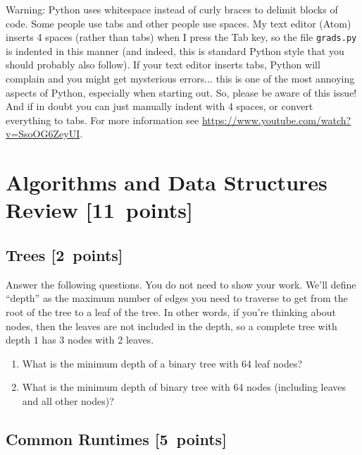 \documentclass{article}
\newcommand{\blu}[1]{{\textcolor{blu}{#1}}}
\let\ask\blu
\newcommand\pts[1]{\textcolor{pointscolour}{[#1~points]}}
\begin{document}
  Warning: Python uses whitespace instead of curly braces to delimit blocks of code.
  Some people use tabs and other people use spaces. My text editor (Atom) inserts 4 spaces (rather than tabs) when
  I press the Tab key, so the file \texttt{grads.py} is indented in this manner (and indeed, this is standard Python style that you should probably also follow). If your text editor inserts tabs,
  Python will complain and you might get mysterious errors... this is one of the most annoying aspects
  of Python, especially when starting out. So, please be aware of this issue! And if in doubt you can just manually
  indent with 4 spaces, or convert everything to tabs. For more information
  see \url{https://www.youtube.com/watch?v=SsoOG6ZeyUI}.


  \clearpage\section{Algorithms and Data Structures Review \pts{11}}

  \subsection{Trees \pts{2}}

  \ask{Answer the following questions.} You do not need to show your work. We'll define ``depth'' as the maximum number of edges you need to traverse to get from the root of the tree to a leaf of the tree. In other words, if you're thinking about nodes, then the leaves are not included in the depth, so a complete tree with depth $1$ has 3 nodes with 2 leaves.


  \begin{enumerate}
  \item What is the minimum depth of a binary tree with 64 leaf nodes?
  \item What is the minimum depth of binary tree with 64 nodes (including leaves and all other nodes)?
  \end{enumerate}

  \subsection{Common Runtimes \pts{5}}
\end{document}
